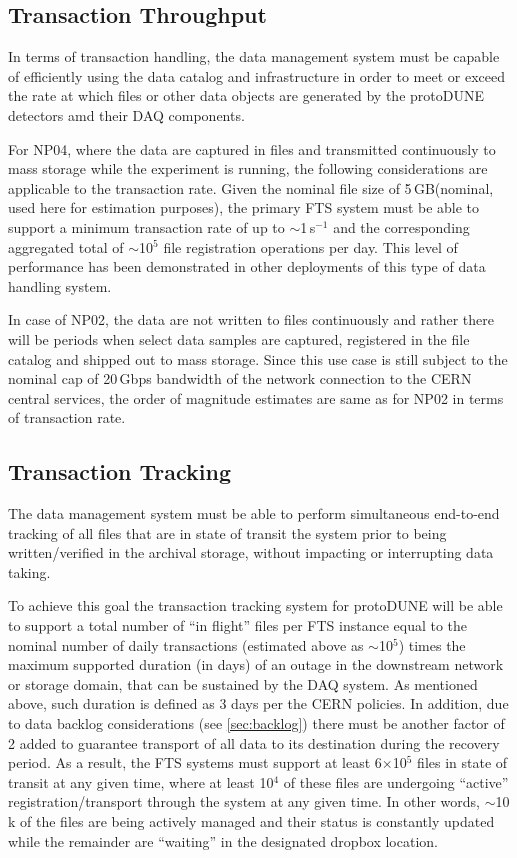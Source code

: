 \documentclass[12pt]{article}
\newcommand{\pd}{protoDUNE\xspace}
\newcommand{\filesize}{5\,GB\xspace}
\begin{document}
\subsection{Transaction Throughput}

In terms of transaction handling,  the data management system must be capable of efficiently using the data
catalog and infrastructure in order to meet or exceed the rate at which files or other data
objects are generated by the \pd detectors amd their DAQ components.

For NP04, where the data are captured in files and transmitted continuously to mass storage while
the experiment is running, the following considerations are applicable to the transaction rate.
Given the nominal file size of \filesize (nominal, used here for estimation purposes), 
the primary FTS system must be able to support a minimum transaction rate of up to  $\sim$1\,s$^{-1}$
and the corresponding aggregated total of $\sim$10$^5$ file registration operations per day.
This level of performance has been demonstrated in other deployments of this type of data
handling system.

In case of NP02, the data are not written to files continuously and rather there will be periods when
select data samples are captured, registered in the file catalog and shipped out to mass storage.
Since this use case is still subject to the nominal cap of 20\,Gbps bandwidth of the network connection
to the CERN central services, the order of magnitude estimates are same as for NP02 in terms of transaction rate.

\subsection{Transaction Tracking}
The data management system must be able to perform simultaneous end-to-end tracking
of all files that are in state of transit the system prior to being written/verified in the archival storage,
without impacting or interrupting data taking. 

To achieve this goal the transaction tracking system for \pd will be
able to support a total number of ``in flight'' files per FTS instance equal to the nominal number of daily transactions
(estimated above as $\sim$10$^5$) times the maximum supported duration (in days)
of an outage in the downstream network or storage domain, that can be sustained by the DAQ system.
As mentioned above, such duration is defined as 3 days per the CERN policies. In addition, due to data backlog considerations
(see \ref{sec:backlog}) there must be another factor of 2 added to guarantee transport of all data to its destination during
the recovery period. As a result, the FTS systems must support at least 6$\times$10$^5$ files in state of transit at any given time,
where at least 10$^4$ of these files are undergoing ``active'' registration/transport through the system at any given time.
In other words, $\sim$10\,k of the files are being actively
managed and their status is constantly updated while the remainder are ``waiting'' in the designated dropbox location.
\end{document}
